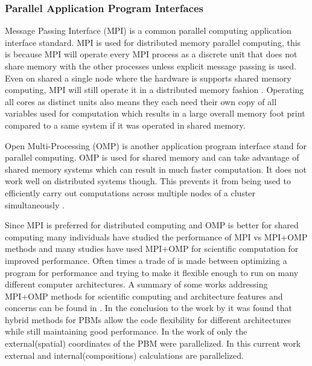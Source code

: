 \documentclass[preprint,11pt,authoryear]{elsarticle}
\begin{document}
	    \subsubsection{Parallel Application Program Interfaces}
	    \par Message Passing Interface (MPI) is a common parallel computing application interface standard. MPI is used for distributed memory parallel computing, this is because MPI will operate every MPI process as a discrete unit that does not share memory with the other processes unless explicit message passing is used. Even on shared a single node where the hardware is supports shared memory computing, MPI will still operate it in a distributed memory fashion \cite{Jin2011}. Operating all cores as distinct units also means they each need their own copy of all variables used for computation which results in a large overall memory foot print compared to a same system if it was operated in shared memory. 
	    \par Open Multi-Processing (OMP) is another application program interface stand for parallel computing. OMP is used for shared memory and can take advantage of shared memory systems which can result in much faster computation. It does not work well on distributed systems though. This prevents it from being used to efficiently carry out computations across multiple nodes of a cluster simultaneously \cite{Jin2011}. 
	    \par Since MPI is preferred for distributed computing and OMP is better for shared computing many individuals have studied the performance of MPI vs MPI+OMP methods and many studies have used MPI+OMP for scientific computation for improved performance. Often times a trade of is made between optimizing a program for performance and trying to make it flexible enough to run on many different computer architectures. A summary of some works addressing MPI+OMP methods for scientific computing and architecture features and concerns can be found in \cite{Bettencourt2017}. In the conclusion to the work by \cite{Bettencourt2017} it was found that hybrid methods for PBMs allow the code flexibility for different architectures while still maintaining good performance.  In the work of \cite{Bettencourt2017} only the external(spatial) coordinates of the PBM were parallelized. In this current work external and internal(compositions) calculations are parallelized.%
	      
\end{document}
